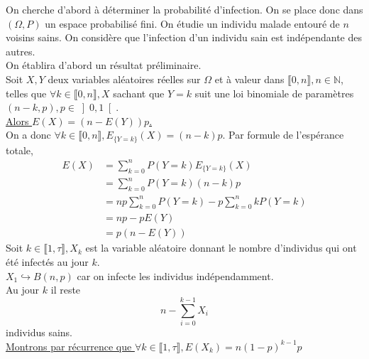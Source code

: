 \documentclass{article}
\begin{document}
	On cherche d'abord à déterminer la probabilité d'infection. On se place donc dans $(\Omega, P)$ un espace probabilisé fini. On étudie un individu malade entouré de $n$ voisins sains. On considère que l'infection d'un individu sain est indépendante des autres. \\
	On établira d'abord un résultat préliminaire.\\
	Soit $X, Y$ deux variables aléatoires réelles sur $\Omega$ et à valeur dans $\llbracket 0, n \rrbracket, n \in \mathbb{N}$, telles que $\forall k \in \llbracket 0, n \rrbracket, X$ sachant que $Y = k$ suit une loi binomiale de paramètres $(n-k, p), p \in \left]0, 1\right[$.\\ \underline{Alors $E(X) = (n - E(Y))p$.}\\[0.2cm]
	On a donc $\forall k \in \llbracket 0, n \rrbracket, E_{\{Y = k\}}(X) = (n - k)p$. Par formule de l'espérance totale, 
	\begin{align*}
	E(X) &= \sum_{k=0}^n P(Y = k)E_{\{Y = k\}}(X)  \\
	     &= \sum_{k=0}^n P(Y=k)(n-k)p \\
		 &= np\sum_{k=0}^n P(Y = k) - p\sum_{k=0}^n kP(Y=k) \\
		 &= np - pE(Y) \\
		 &= p(n - E(Y))
	\end{align*}
	Soit $k \in \llbracket 1, \tau \rrbracket, X_k$ est la variable aléatoire donnant le nombre d'individus qui ont été infectés au jour $k$.\\
	$X_1 \hookrightarrow B(n, p)$ car on infecte les individus indépendamment.\\ 
	Au jour $k$ il reste $$n - \sum_{i = 0}^{k-1} X_i$$ individus sains.\\[0.2cm] \underline{Montrons par récurrence que $\forall k \in \llbracket 1, \tau \rrbracket, E(X_k) = n(1-p)^{k-1}p$}\\[0.2cm]
	
\end{document}
